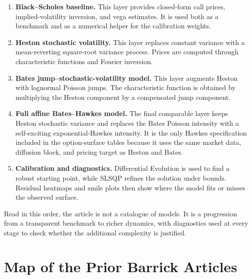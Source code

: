 \documentclass[a4paper,10pt,titlepage,oneside,openany]{book}
\theoremstyle{plain}
\theoremstyle{definition}
\theoremstyle{remark}
\begin{document}
\begin{enumerate}[leftmargin=8mm, itemsep=2pt]
    \item \textbf{Black--Scholes baseline.} This layer provides closed-form call prices, implied-volatility inversion, and vega estimates. It is used both as a benchmark and as a numerical helper for the calibration weights.
    \item \textbf{Heston stochastic volatility.} This layer replaces constant variance with a mean-reverting square-root variance process. Prices are computed through characteristic functions and Fourier inversion.
    \item \textbf{Bates jump--stochastic-volatility model.} This layer augments Heston with lognormal Poisson jumps. The characteristic function is obtained by multiplying the Heston component by a compensated jump component.
    \item \textbf{Full affine Bates--Hawkes model.} The final comparable layer keeps Heston stochastic variance and replaces the Bates Poisson intensity with a self-exciting exponential-Hawkes intensity. It is the only Hawkes specification included in the option-surface tables because it uses the same market data, diffusion block, and pricing target as Heston and Bates.
    \item \textbf{Calibration and diagnostics.} Differential Evolution is used to find a robust starting point, while SLSQP refines the solution under bounds. Residual heatmaps and smile plots then show where the model fits or misses the observed surface.
\end{enumerate}

Read in this order, the article is not a catalogue of models. It is a progression from a transparent benchmark to richer dynamics, with diagnostics used at every stage to check whether the additional complexity is justified.

\section{Map of the Prior Barrick Articles}
\end{document}
